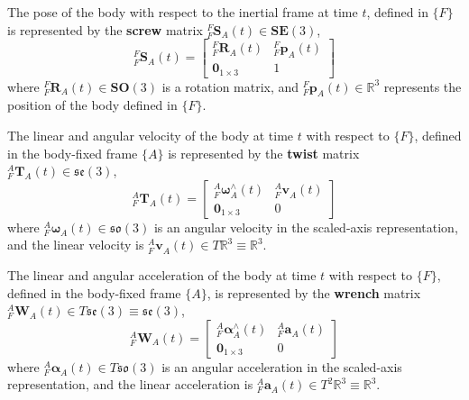 		The pose of the body with respect to the inertial frame at time $t$, defined in $\{F\}$ is represented by the \textbf{screw} matrix ${^{F}_{F}\mathbf{S}^{}_{A}(t)} \in \mathbf{SE}(3)$,
		\begin{equation}
				{^{F}_{F}\mathbf{S}^{}_{A}(t)} = 
				\begin{bmatrix}
						  ^{F}_{F}\mathbf{R}^{}_{A}(t) 	& 	^{F}_{F}\mathbf{p}^{}_{A}(t)\\
						  \textbf{0}_{1 \times 3} & 1						  
				\end{bmatrix}
		\end{equation}
		where $^{F}_{F}\mathbf{R}^{}_{A}(t) \in \mathbf{SO}(3)$ is a rotation matrix, and $^{F}_{F}\mathbf{p}^{}_{A}(t) \in \mathbb{R}^3$ represents the position of the body defined in $\{F\}$.
		
		The linear and angular velocity of the body at time $t$ with respect to $\{F\}$, defined in the body-fixed frame $\{A\}$ is represented by the \textbf{twist} matrix ${^{A}_{F}\mathbf{T}^{}_{A}(t)} \in \mathfrak{se}(3)$,
		\begin{equation}
				{^{A}_{F}\mathbf{T}^{}_{A}(t)} = 
				\begin{bmatrix}
		  {^{A}_{F}\bm{\omega}^{\wedge}_{A}}(t) 	& 	^{A}_{F}\mathbf{v}^{}_{A}(t)\\
		  \textbf{0}_{1 \times 3} & 0						  
				\end{bmatrix}
		\end{equation}
		where $^{A}_{F}\bm{\omega}^{}_{A}(t) \in \mathfrak{so}(3)$ is an angular velocity in the scaled-axis representation, and the linear velocity is $^{A}_{F}\mathbf{v}^{}_{A}(t) \in T\mathbb{R}^3 \equiv \mathbb{R}^3$.
				
		The linear and angular acceleration of the body at time $t$ with respect to $\{F\}$, defined in the body-fixed frame $\{A\}$, is represented by the \textbf{wrench} matrix ${^{A}_{F}\mathbf{W}^{}_{A}(t)} \in T\mathfrak{se}(3) \equiv \mathfrak{se}(3)$,
		\begin{equation}
				{^{A}_{F}\mathbf{W}^{}_{A}(t)} = 
				\begin{bmatrix}
				  {^{A}_{F}\bm{\alpha}^{\wedge}_{A}}(t) 	& 	^{A}_{F}\mathbf{a}^{}_{A}(t)\\
				  \textbf{0}_{1 \times 3} & 0						  
				\end{bmatrix}
		\end{equation}
		where $^{A}_{F}\bm{\alpha}^{}_{A}(t) \in  T\mathfrak{so}(3)$ is an angular acceleration in the scaled-axis representation, and the linear acceleration is $^{A}_{F}\mathbf{a}^{}_{A}(t) \in T^2\mathbb{R}^3 \equiv \mathbb{R}^3$.
						
